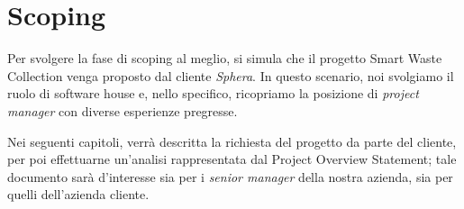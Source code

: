 \section{Scoping}
\label{sec:scoping}

Per svolgere la fase di scoping al meglio, si simula che il progetto Smart Waste Collection venga proposto dal cliente
\textit{Sphera}. In questo scenario, noi svolgiamo il ruolo di software house e, nello specifico, ricopriamo la posizione di
\textit{project manager} con diverse esperienze pregresse.

Nei seguenti capitoli, verrà descritta la richiesta del progetto da parte del cliente, per poi effettuarne un'analisi
rappresentata dal Project Overview Statement; tale documento sarà d'interesse sia per i \textit{senior manager} della
nostra azienda, sia per quelli dell'azienda cliente.

